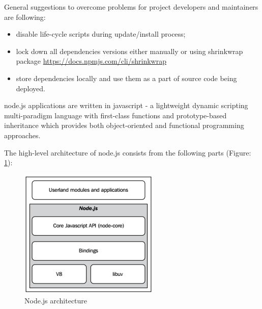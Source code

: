 General suggestions to overcome problems for project developers and maintainers are following:
\begin{itemize}
	\item disable life-cycle scripts during update/install process;
	\item lock down all dependencies versions either manually or using shrinkwrap package \url{https://docs.npmjs.com/cli/shrinkwrap}
	\item store dependencies locally and use them as a part of source code being deployed.
\end{itemize}


node.js applications are written in javascript - a lightweight dynamic scripting multi-paradigm language with first-class functions and prototype-based inheritance which provides both object-oriented and functional programming approaches\cite{mdnJS}.


 
The high-level architecture of node.js consists from the following parts (Figure: \ref{fig:nodeArch}): 
\begin{figure}[ht]
  	\label{fig:nodeArch}
    \centering
    \includegraphics[scale=1.0]{grafiken/nodeArchitecture.png}
     \caption{Node.js architecture \cite{nodejsbook}}
  \end{figure}

